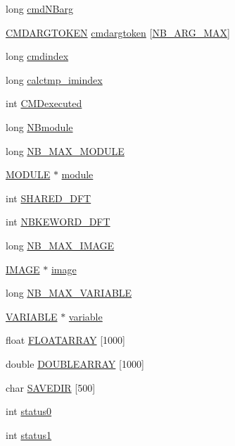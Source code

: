 \begin{DoxyCompactItemize}
\item 
long \hyperlink{structDATA_a6facd114f508ec4fcb52003b9f93d123}{cmd\+N\+Barg}
\item 
\hyperlink{structCMDARGTOKEN}{C\+M\+D\+A\+R\+G\+T\+O\+K\+E\+N} \hyperlink{structDATA_a1072fcd97dbe8660a3b3d7d54b21b300}{cmdargtoken} \mbox{[}\hyperlink{CLIcore_8h_a0a6b220d813ff622977cf6d7f1f5ffa6}{N\+B\+\_\+\+A\+R\+G\+\_\+\+M\+A\+X}\mbox{]}
\item 
long \hyperlink{structDATA_af462cdcbd42307c3dacf0891ba4dd8ca}{cmdindex}
\item 
long \hyperlink{structDATA_a11b6d226ab6612bc5a418abb89b56feb}{calctmp\+\_\+imindex}
\item 
int \hyperlink{structDATA_a51e21d55f2eeba8ae6c9f9f02311eeef}{C\+M\+Dexecuted}
\item 
long \hyperlink{structDATA_a4ef780e882fa0d3ad2462be54dc58f4e}{N\+Bmodule}
\item 
long \hyperlink{structDATA_aa3ce94f1c13e2a2b3acc31caca1f3b95}{N\+B\+\_\+\+M\+A\+X\+\_\+\+M\+O\+D\+U\+L\+E}
\item 
\hyperlink{structMODULE}{M\+O\+D\+U\+L\+E} $\ast$ \hyperlink{structDATA_a0a1527cfaff533ba10df8cfdf519002a}{module}
\item 
int \hyperlink{structDATA_a64d5b0ed5d5cedf11ff69ebf8d30dc20}{S\+H\+A\+R\+E\+D\+\_\+\+D\+F\+T}
\item 
int \hyperlink{structDATA_aece2a33a30b5f15d8250cee2a8f0aa02}{N\+B\+K\+E\+W\+O\+R\+D\+\_\+\+D\+F\+T}
\item 
long \hyperlink{structDATA_a2522406c33b8f890757cfbd8db858f77}{N\+B\+\_\+\+M\+A\+X\+\_\+\+I\+M\+A\+G\+E}
\item 
\hyperlink{structIMAGE}{I\+M\+A\+G\+E} $\ast$ \hyperlink{structDATA_aafd2755d1c0845d9f671d42c916469ed}{image}
\item 
long \hyperlink{structDATA_adbdde6182898eaf675b02e337dc93750}{N\+B\+\_\+\+M\+A\+X\+\_\+\+V\+A\+R\+I\+A\+B\+L\+E}
\item 
\hyperlink{structVARIABLE}{V\+A\+R\+I\+A\+B\+L\+E} $\ast$ \hyperlink{structDATA_a38336f0ef793c2aef2a6f3a20e3e361b}{variable}
\item 
float \hyperlink{structDATA_a58210ca81311d78d220027755351f8b8}{F\+L\+O\+A\+T\+A\+R\+R\+A\+Y} \mbox{[}1000\mbox{]}
\item 
double \hyperlink{structDATA_a15076d931e1bc151a4a9933e09f344b1}{D\+O\+U\+B\+L\+E\+A\+R\+R\+A\+Y} \mbox{[}1000\mbox{]}
\item 
char \hyperlink{structDATA_a883b88f5c5cca024bfc4240cda302dd7}{S\+A\+V\+E\+D\+I\+R} \mbox{[}500\mbox{]}
\item 
int \hyperlink{structDATA_a14eafa363f5cd5dd7ff9ca0744029565}{status0}
\item 
int \hyperlink{structDATA_acc1a46fa384934e24a89660d8d0c9f7a}{status1}
\end{DoxyCompactItemize}


